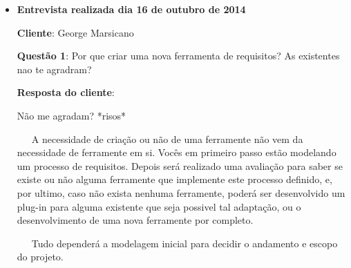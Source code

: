 \begin{itemize}
	\item \textbf{Entrevista realizada dia 16 de outubro de 2014}

		\textbf{Cliente}: George Marsicano

		\textbf{Questão 1}: Por que criar uma nova ferramenta de requisitos? As existentes nao te agradram?

		\textbf{Resposta do cliente}:

			Não me agradam? *risos*

			\ \ \ A necessidade de criação ou não de uma ferramente não vem da necessidade de ferramente em si.
			Vocês em primeiro passo estão modelando um processo de requisitos. Depois será realizado uma avaliação para saber se existe ou não alguma ferramente que implemente este processo definido, e, por ultimo, caso não exista nenhuma ferramente, poderá ser desenvolvido um plug-in para alguma existente que seja possivel tal adaptação, ou o desenvolvimento de uma nova ferramente por completo.

			\ \ \ Tudo dependerá a modelagem inicial para decidir o andamento e escopo do projeto.
\end{itemize}